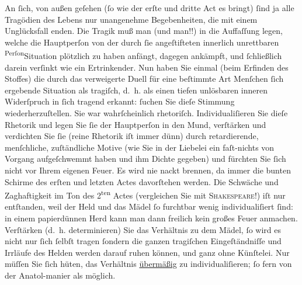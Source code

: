 \pstart
           An ſich, von außen geſehen (ſo wie der erſte und dritte Act es bringt) ſind ja alle Tragödien des Lebens nur unangenehme
               Begebenheiten, die mit einem Unglücksfall enden. Die Tragik muß man (und  man!!) in die Auffaſſung legen, welche die
               Hauptperſon von der durch ſie angeſtifteten {\pb}innerlich unrettbaren \substVorne{}\textsuperscript{Perſon}\substDazwischen{}Situation\substHinten{} plötzlich zu haben anfängt, dagegen ankämpft, und ſchließlich darein
               verſinkt wie ein Ertrinkender. Nun haben Sie einmal (beim Erfinden des Stoffes) die durch das
               verweigerte Duell für eine beſtimmte Art Menſchen ſich ergebende Situation als
               tragiſch, d. h. als einen tiefen unlösbaren inneren Widerſpruch in ſich tragend
               erkannt: {\pb}ſuchen Sie dieſe
               Stimmung wiederherzuſtellen. Sie war wahrſcheinlich rhetoriſch. Individualiſieren Sie
               dieſe Rhetorik und legen Sie ſie der Hauptperſon in den Mund, verſtärken und
               verdichten Sie ſie (reine Rhetorik iſt immer dünn) durch retardierende, menſchliche,
               zuſtändliche Motive (wie Sie in der Liebelei ein
               faſt-nichts von Vorgang aufgeſchwemmt haben und ihm Dichte gegeben) {\pb}und fürchten Sie ſich nicht vor
               Ihrem eigenen Feuer. Es wird nie nackt brennen, da immer die bunten Schirme des
               erſten und letzten Actes davorſtehen werden. Die Schwäche und Zaghaftigkeit im Ton
               des 2\textsuperscript{ten} Actes (vergleichen Sie mit \textsc{Shakeſpeare}!) iſt nur entſtanden, weil der Held und das Mädel ſo furchtbar wenig
               individualiſiert ſind: in einem papierdünnen Herd kann man dann freilich kein großes
               Feuer anmachen. {\pb}Verſtärken \introOben{}(d. h. determinieren)\introOben{} Sie das Verhältnis zu dem Mädel, ſo wird
               es nicht nur ſich ſelbſt tragen ſondern die ganzen tragiſchen Eingeſtändniſſe und
               Irrläufe des Helden werden darauf ruhen können, und ganz ohne Künſtelei. Nur müſſen
               Sie ſich hüten, das Verhältnis \uline{übermäßig} zu
               individualiſieren; ſo fern von der Anatol-manier
               als möglich.\pend
           
